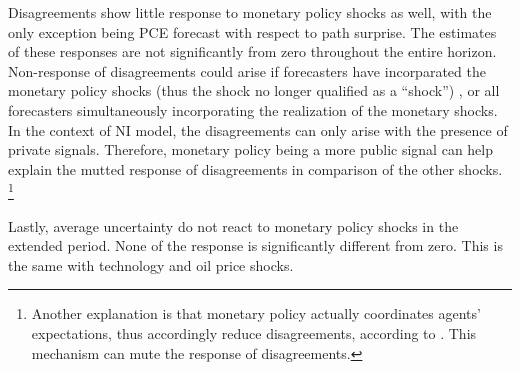 \documentclass[]{article}
\begin{document}
Disagreements show little response to monetary policy shocks as well, with the only exception being PCE forecast with respect to path surprise. The estimates of these responses are not  significantly from zero throughout the entire horizon. Non-response of disagreements could arise if forecasters have incorparated the monetary policy shocks (thus the shock no longer qualified as a ``shock'') , or all forecasters simultaneously incorporating the realization of the monetary shocks. In the context of NI model, the disagreements can only arise with the presence of private signals. Therefore, monetary policy being a more public signal can help explain the mutted response of disagreements in comparison of the other shocks. \footnote{Another explanation is that monetary policy actually coordinates agents' expectations, thus accordingly reduce disagreements, according to \citet{morris2002social}. This mechanism can mute the response of disagreements.}

Lastly, average uncertainty do not react to monetary policy shocks in the extended period. None of the response is significantly different from zero. This is the same with technology and oil price shocks. 
\end{document}
